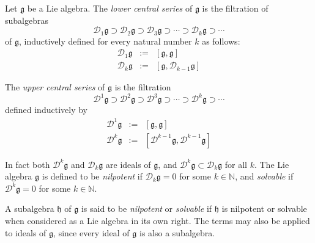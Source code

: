 \documentclass[12pt]{article}
\newcommand{\g}{\mathfrak{g}}
\newcommand{\D}{\mathcal{D}}
\newcommand{\h}{\mathfrak{h}}
\begin{document}
Let $\g$ be a Lie algebra. The {\em lower central series} of $\g$ is the filtration of subalgebras
$$
\D_1 \g \supset \D_2 \g \supset \D_3 \g \supset \cdots \supset \D_k \g \supset \cdots
$$
of $\g$, inductively defined for every natural number $k$ as follows:
\begin{eqnarray*}
\D_1 \g & := & [\g,\g] \\
\D_k \g & := & [\g, \D_{k-1} \g]
\end{eqnarray*}

The {\em upper central series} of $\g$ is the filtration
$$
\D^1 \g \supset \D^2 \g \supset \D^3 \g \supset \cdots \supset \D^k \g \supset \cdots
$$
defined inductively by
\begin{eqnarray*}
\D^1 \g & := & [\g,\g] \\
\D^k \g & := & [\D^{k-1} \g, \D^{k-1} \g]
\end{eqnarray*}

In fact both $\D^k \g$ and $\D_k \g$ are ideals of $\g$, and $\D^k \g \subset \D_k \g$ for all $k$. The Lie algebra $\g$ is defined to be {\em nilpotent} if $\D_k \g = 0$ for some $k \in \mathbb{N}$, and {\em solvable} if $\D^k \g = 0$ for some $k \in \mathbb{N}$.

A subalgebra $\h$ of $\g$ is said to be {\em nilpotent} or {\em solvable} if $\h$ is nilpotent or solvable when considered as a Lie algebra in its own right. The terms may also be applied to ideals of $\g$, since every ideal of $\g$ is also a subalgebra.
\end{document}
